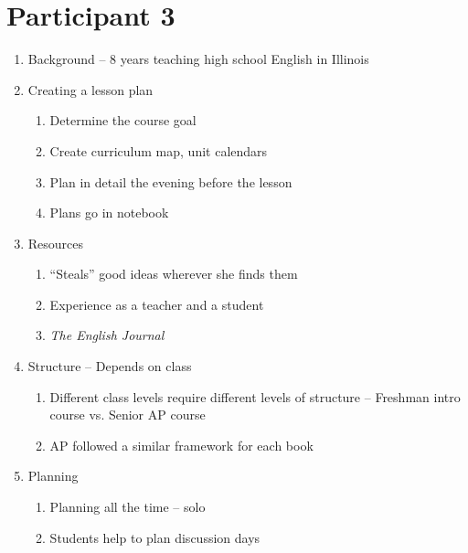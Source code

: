 \documentclass[11pt,letter]{article}
\begin{document}
\section*{Participant 3}
\begin{enumerate}
	\item Background -- 8 years teaching high school English in Illinois

	\item Creating a lesson plan
		\begin{enumerate}
			\item Determine the course goal

			\item Create curriculum map, unit calendars

			\item Plan in detail the evening before the lesson

			\item Plans go in notebook

		\end{enumerate}

	\item Resources
		\begin{enumerate}
			\item ``Steals'' good ideas wherever she finds them

			\item Experience as a teacher and a student

			\item \textit{The English Journal}

		\end{enumerate}

	\item Structure -- Depends on class
		\begin{enumerate}
			\item Different class levels require different levels of structure
				-- Freshman intro course vs. Senior AP course

			\item AP followed a similar framework for each book

		\end{enumerate}

	\item Planning
		\begin{enumerate}
			\item Planning all the time -- solo

			\item Students help to plan discussion days


\end{enumerate}
\end{enumerate}
\end{document}
